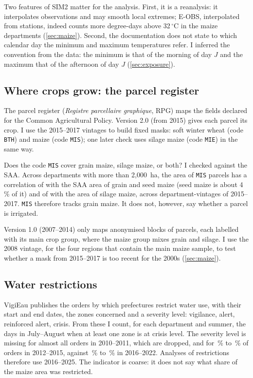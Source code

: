 Two features of SIM2 matter for the analysis. First, it is a reanalysis: it interpolates observations and may smooth local extremes; E-OBS, interpolated from stations, indeed counts more degree-days above 32\,$^{\circ}$C in the maize departments (\cref{sec:maize}). Second, the documentation does not state to which calendar day the minimum and maximum temperatures refer. I inferred the convention from the data: the minimum is that of the morning of day $J$ and the maximum that of the afternoon of day $J$ (\cref{sec:exposure}).

\subsection{Where crops grow: the parcel register}

The parcel register (\emph{Registre parcellaire graphique}, RPG) maps the fields declared for the Common Agricultural Policy. Version 2.0 (from 2015) gives each parcel its crop. I use the 2015--2017 vintages to build fixed masks: soft winter wheat (code \texttt{BTH}) and maize (code \texttt{MIS}); one later check uses silage maize (code \texttt{MIE}) in the same way.

Does the code \texttt{MIS} cover grain maize, silage maize, or both? I checked against the SAA. Across departments with more than 2,000~ha, the area of \texttt{MIS} parcels has a correlation of \MaskCorrGrain{} with the SAA area of grain and seed maize (seed maize is about 4\,\% of it) and of \MaskCorrFodder{} with the area of silage maize, across department-vintages of 2015--2017. \texttt{MIS} therefore tracks grain maize. It does not, however, say whether a parcel is irrigated.

Version 1.0 (2007--2014) only maps anonymised blocks of parcels, each labelled with its main crop group, where the maize group mixes grain and silage. I use the 2008 vintage, for the four regions that contain the main maize sample, to test whether a mask from 2015--2017 is too recent for the 2000s (\cref{sec:maize}).

\subsection{Water restrictions}

VigiEau publishes the orders by which prefectures restrict water use, with their start and end dates, the zones concerned and a severity level: vigilance, alert, reinforced alert, crisis. From these I count, for each department and summer, the days in July--August when at least one zone is at crisis level. The severity level is missing for almost all orders in 2010--2011, which are dropped, and for \VigiMissEarlyMin\,\% to \VigiMissEarlyMax\,\% of orders in 2012--2015, against \VigiMissMidMin\,\% to \VigiMissMidMax\,\% in 2016--2022. Analyses of restrictions therefore use 2016--2025. The indicator is coarse: it does not say what share of the maize area was restricted.

